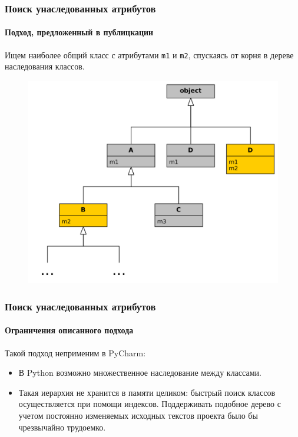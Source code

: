 \documentclass{beamer}
\begin{document}
\begin{frame}
  \frametitle{Поиск унаследованных атрибутов}
  \framesubtitle{Подход, предложенный в публицкации}
    
  Ищем наиболее общий класс с атрибутами \texttt{m1} и \texttt{m2}, спускаясь от
  корня в дереве наследования классов.

  \begin{figure}
    \begin{center}
      \includegraphics[width=0.6\linewidth]{fig/class-search-example.png}
    \end{center}
  \end{figure}
\end{frame}

\begin{frame}
  \frametitle{Поиск унаследованных атрибутов}
  \framesubtitle{Ограничения описанного подхода}

  Такой подход неприменим в PyCharm:
  \begin{itemize}
      \item В Python возможно множественное наследование между классами.

      \item Такая иерархия не хранится в памяти целиком: быстрый поиск классов
        осуществляется при помощи индексов. Поддерживать подобное дерево с
        учетом постоянно изменяемых исходных текстов проекта было бы чрезвычайно
        трудоемко.
  \end{itemize}
  
\end{frame}
\end{document}
